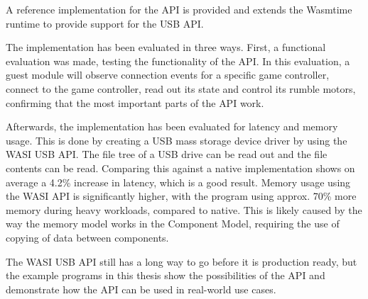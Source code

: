 A reference implementation for the \acrshort{API} is provided \cite{wasi_usb} and extends the Wasmtime \cite{wasmtime_website} runtime to provide support for the \acrshort{USB} \acrshort{API}.

The implementation has been evaluated in three ways. First, a functional evaluation was made, testing the functionality of the API. In this evaluation, a guest module will observe connection events for a specific game controller, connect to the game controller, read out its state and control its rumble motors, confirming that the most important parts of the \acrshort{API} work.

Afterwards, the implementation has been evaluated for latency and memory usage. This is done by creating a \acrshort{USB} mass storage device driver by using the \acrshort{WASI} \acrshort{USB} \acrshort{API}. The file tree of a \acrshort{USB} drive can be read out and the file contents can be read. Comparing this against a native implementation shows on average a 4.2\% increase in latency, which is a good result. Memory usage using the \acrshort{WASI} \acrshort{API} is significantly higher, with the program using approx. 70\% more memory during heavy workloads, compared to native. This is likely caused by the way the memory model works in the Component Model, requiring the use of copying of data between components.

The \acrshort{WASI} \acrshort{USB} \acrshort{API} still has a long way to go before it is production ready, but the example programs in this thesis show the possibilities of the \acrshort{API} and demonstrate how the \acrshort{API} can be used in real-world use cases.